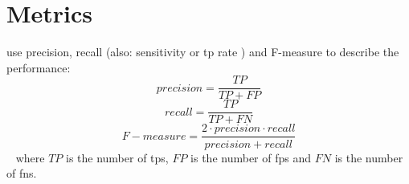 \section{Metrics}
\label{sec:metrics}

\citet{chen_web_2008} use precision, recall (also: sensitivity or \acl{tp} rate \cite{palivela_optimization_2021}) 
and F-measure to describe the performance:
$$precision = \frac{TP}{TP + FP}$$
$$recall = \frac{TP}{TP + FN}$$
$$F-measure = \frac{2 \cdot precision \cdot recall}{precision + recall}$$~\cite{chen_web_2008,abbasi_writeprints_2008}
where $TP$ is the number of \aclp{tp}, $FP$ is the number of \aclp{fp} 
and $FN$ is the number of \aclp{fn}.